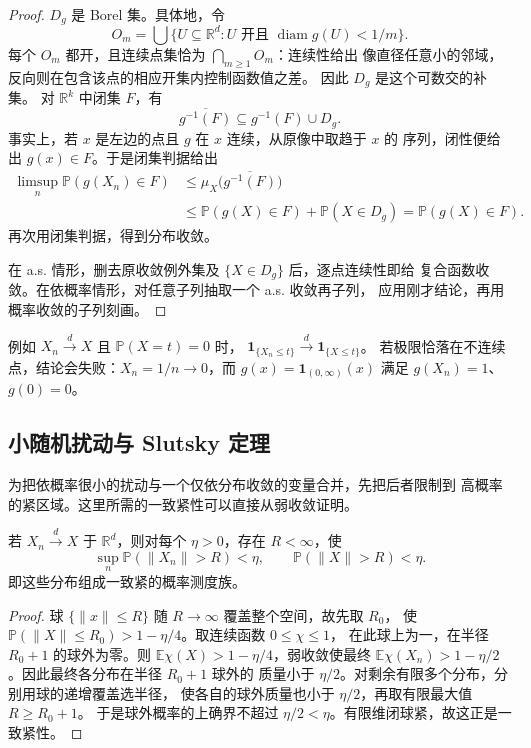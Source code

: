 \begin{proof}
$D_g$ 是 Borel 集。具体地，令
\[
 O_m=\bigcup\{U\subseteq\mathbb R^d:U\text{ 开且 }\operatorname{diam}g(U)<1/m\}.
\]
每个 $O_m$ 都开，且连续点集恰为 $\bigcap_{m\ge1}O_m$：连续性给出
像直径任意小的邻域，反向则在包含该点的相应开集内控制函数值之差。
因此 $D_g$ 是这个可数交的补集。
对 $\mathbb R^k$ 中闭集 $F$，有
\[
 \overline{g^{-1}(F)}\subseteq g^{-1}(F)\cup D_g.
\]
事实上，若 $x$ 是左边的点且 $g$ 在 $x$ 连续，从原像中取趋于 $x$ 的
序列，闭性便给出 $g(x)\in F$。于是闭集判据给出
\begin{align*}
 \limsup_n\mathbb P(g(X_n)\in F)
 &\le\mu_X\bigl(\overline{g^{-1}(F)}\bigr)\\
 &\le\mathbb P(g(X)\in F)+\mathbb P(X\in D_g)
 =\mathbb P(g(X)\in F).
\end{align*}
再次用闭集判据，得到分布收敛。

在 a.s. 情形，删去原收敛例外集及 $\{X\in D_g\}$ 后，逐点连续性即给
复合函数收敛。在依概率情形，对任意子列抽取一个 a.s. 收敛再子列，
应用刚才结论，再用概率收敛的子列刻画。
\end{proof}

例如 $X_n\xrightarrow dX$ 且 $\mathbb P(X=t)=0$ 时，
$\mathbf1_{\{X_n\le t\}}\xrightarrow d\mathbf1_{\{X\le t\}}$。
若极限恰落在不连续点，结论会失败：$X_n=1/n\to0$，而
$g(x)=\mathbf1_{(0,\infty)}(x)$ 满足 $g(X_n)=1$、$g(0)=0$。

\subsection{小随机扰动与 Slutsky 定理}

为把依概率很小的扰动与一个仅依分布收敛的变量合并，先把后者限制到
高概率的紧区域。这里所需的一致紧性可以直接从弱收敛证明。

\begin{lemma}
\label{lem:weak-convergence-uniform-tightness}
若 $X_n\xrightarrow dX$ 于 $\mathbb R^d$，则对每个 $\eta>0$，存在
$R<\infty$，使
\[
 \sup_n\mathbb P(\|X_n\|>R)<\eta,
 \qquad\mathbb P(\|X\|>R)<\eta.
\]
即这些分布组成一致紧的概率测度族。
\end{lemma}

\begin{proof}
球 $\{\|x\|\le R\}$ 随 $R\to\infty$ 覆盖整个空间，故先取 $R_0$，
使 $\mathbb P(\|X\|\le R_0)>1-\eta/4$。取连续函数 $0\le\chi\le1$，
在此球上为一，在半径 $R_0+1$ 的球外为零。则
$\mathbb E\chi(X)>1-\eta/4$，弱收敛使最终
$\mathbb E\chi(X_n)>1-\eta/2$。因此最终各分布在半径 $R_0+1$ 球外的
质量小于 $\eta/2$。对剩余有限多个分布，分别用球的递增覆盖选半径，
使各自的球外质量也小于 $\eta/2$，再取有限最大值 $R\ge R_0+1$。
于是球外概率的上确界不超过 $\eta/2<\eta$。有限维闭球紧，故这正是一致紧性。
\end{proof}

